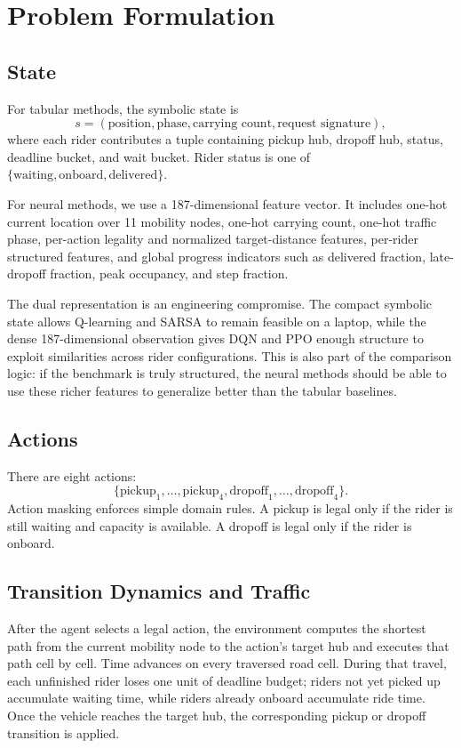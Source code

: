 \documentclass{article}
\begin{document}
\section{Problem Formulation}

\subsection{State}
For tabular methods, the symbolic state is
\[
s = (\text{position}, \text{phase}, \text{carrying count}, \text{request signature}),
\]
where each rider contributes a tuple containing pickup hub, dropoff hub, status, deadline bucket, and wait bucket. Rider status is one of \(\{\text{waiting}, \text{onboard}, \text{delivered}\}\).

For neural methods, we use a 187-dimensional feature vector. It includes one-hot current location over 11 mobility nodes, one-hot carrying count, one-hot traffic phase, per-action legality and normalized target-distance features, per-rider structured features, and global progress indicators such as delivered fraction, late-dropoff fraction, peak occupancy, and step fraction.

The dual representation is an engineering compromise. The compact symbolic state allows Q-learning and SARSA to remain feasible on a laptop, while the dense 187-dimensional observation gives DQN and PPO enough structure to exploit similarities across rider configurations. This is also part of the comparison logic: if the benchmark is truly structured, the neural methods should be able to use these richer features to generalize better than the tabular baselines.

\subsection{Actions}
There are eight actions:
\[
\{\text{pickup}_1,\dots,\text{pickup}_4,\text{dropoff}_1,\dots,\text{dropoff}_4\}.
\]
Action masking enforces simple domain rules. A pickup is legal only if the rider is still waiting and capacity is available. A dropoff is legal only if the rider is onboard.

\subsection{Transition Dynamics and Traffic}
After the agent selects a legal action, the environment computes the shortest path from the current mobility node to the action's target hub and executes that path cell by cell. Time advances on every traversed road cell. During that travel, each unfinished rider loses one unit of deadline budget; riders not yet picked up accumulate waiting time, while riders already onboard accumulate ride time. Once the vehicle reaches the target hub, the corresponding pickup or dropoff transition is applied.
\end{document}
